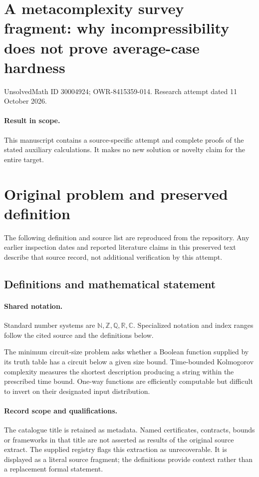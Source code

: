 \documentclass[11pt]{article}
\begin{document}
\section*{A metacomplexity survey fragment: why incompressibility does not prove average-case hardness}
\noindent UnsolvedMath ID 30004924; OWR-8415359-014. Research attempt dated 11 October 2026.
\paragraph{Result in scope.}This manuscript contains a source-specific attempt and complete proofs of the stated auxiliary calculations. It makes no new solution or novelty claim for the entire target.
\section{Original problem and preserved definition}
The following definition and source list are reproduced from the repository. Any earlier inspection dates and reported literature claims in this preserved text describe that source record, not additional verification by this attempt.
\subsection{Definitions and mathematical statement}

\paragraph{Shared notation.}Standard number systems are $\mathbb N,\mathbb Z,\mathbb Q,\mathbb R,\mathbb C$. Specialized notation and index ranges follow the cited source and the definitions below.


The minimum circuit-size problem asks whether a Boolean function supplied by its truth table has a circuit below a given size bound. Time-bounded Kolmogorov complexity measures the shortest description producing a string within the prescribed time bound. One-way functions are efficiently computable but difficult to invert on their designated input distribution.
\paragraph{Record scope and qualifications.}
The catalogue title is retained as metadata. Named certificates, contracts, bounds or frameworks in that title are not asserted as results of the original source extract.
The supplied registry flags this extraction as unrecoverable. It is displayed as a literal source fragment; the definitions provide context rather than a replacement formal statement.
\end{document}
